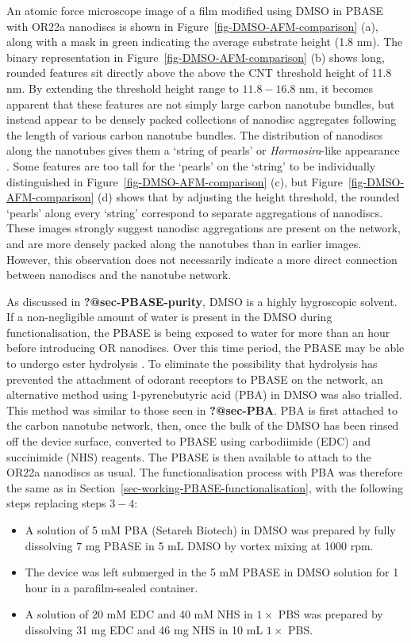 \documentclass[
  a4paper,
]{scrbook}
\begin{document}
An atomic force microscope image of a film modified using DMSO in PBASE
with OR22a nanodiscs is shown in Figure~\ref{fig-DMSO-AFM-comparison}
(a), along with a mask in green indicating the average substrate height
(1.8 nm). The binary representation in
Figure~\ref{fig-DMSO-AFM-comparison} (b) shows long, rounded features
sit directly above the above the CNT threshold height of 11.8 nm. By
extending the threshold height range to \(11.8-16.8\) nm, it becomes
apparent that these features are not simply large carbon nanotube
bundles, but instead appear to be densely packed collections of nanodisc
aggregates following the length of various carbon nanotube bundles. The
distribution of nanodiscs along the nanotubes gives them a `string of
pearls' or \emph{Hormosira}-like appearance
\autocite{NewZealandPlantConservationNetwork}. Some features are too
tall for the `pearls' on the `string' to be individually distinguished
in Figure~\ref{fig-DMSO-AFM-comparison} (c), but
Figure~\ref{fig-DMSO-AFM-comparison} (d) shows that by adjusting the
height threshold, the rounded `pearls' along every `string' correspond
to separate aggregations of nanodiscs. These images strongly suggest
nanodisc aggregations are present on the network, and are more densely
packed along the nanotubes than in earlier images. However, this
observation does not necessarily indicate a more direct connection
between nanodiscs and the nanotube network.

As discussed in \textbf{?@sec-PBASE-purity}, DMSO is a highly
hygroscopic solvent. If a non-negligible amount of water is present in
the DMSO during functionalisation, the PBASE is being exposed to water
for more than an hour before introducing OR nanodiscs. Over this time
period, the PBASE may be able to undergo ester hydrolysis
\autocite{Hermanson2013-3}. To eliminate the possibility that hydrolysis
has prevented the attachment of odorant receptors to PBASE on the
network, an alternative method using 1-pyrenebutyric acid (PBA) in DMSO
was also trialled. This method was similar to those seen in
\textbf{?@sec-PBA}. PBA is first attached to the carbon nanotube
network, then, once the bulk of the DMSO has been rinsed off the device
surface, converted to PBASE using carbodiimide (EDC) and succinimide
(NHS) reagents. The PBASE is then available to attach to the OR22a
nanodiscs as usual. The functionalisation process with PBA was therefore
the same as in Section~\ref{sec-working-PBASE-functionalisation}, with
the following steps replacing steps \(3-4\):

\begin{itemize}
\item
  A solution of 5 mM PBA (Setareh Biotech) in DMSO was prepared by fully
  dissolving 7 mg PBASE in 5 mL DMSO by vortex mixing at 1000 rpm.
\item
  The device was left submerged in the 5 mM PBASE in DMSO solution for 1
  hour in a parafilm-sealed container.
\item
  A solution of 20 mM EDC and 40 mM NHS in \(1 \times\) PBS was prepared
  by dissolving 31 mg EDC and 46 mg NHS in 10 mL \(1 \times\) PBS.
\end{itemize}
\end{document}

